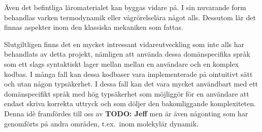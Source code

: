 \begin{draft}
Även det befintliga läromaterialet kan byggas vidare på. I sin nuvarande
form behandlas varken termodynamik eller vågrörelselära något alls. Dessutom lär
det finnas aspekter inom den klassiska mekaniken som fattas.

\end{draft}
\begin{binge}

Slutgiltligen finns det en mycket intressant vidareutveckling som inte alls har
behandlats av detta projekt, nämligen att använda dessa domänspecifika språk som
ett slags syntaktiskt lager mellan mellan en användare och en komplex kodbas. I
många fall kan dessa kodbaser vara implementerade på ointuitivt sätt och utan
någon typsäkerhet. I dessa fall kan det vara mycket användbart med ett
domänspecifikt språk med hög typsäkerhet som möjliggör för en användare att
endast skriva korrekta uttryck och som döljer den bakomliggande komplexiteten.
Denna idè framfördes till oss av \textbf{TODO: Jeff} men är även någonting som
har genomförts på andra områden, t.ex.~inom molekylär dynamik\cite{MD}.

\end{binge}

